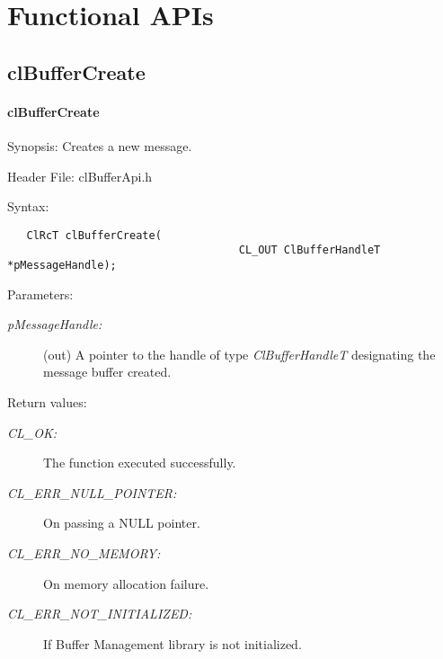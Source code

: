 \newpage
\section{Functional APIs}
\subsection{clBufferCreate}
\hypertarget{pagebuf103}{}\paragraph{cl\-Buffer\-Create}\label{pagebuf103}
\begin{Desc}
\item[Synopsis:]Creates a new message.\end{Desc}
\begin{Desc}
\item[Header File:]clBufferApi.h\end{Desc}
\begin{Desc}
\item[Syntax:]

\footnotesize\begin{verbatim}   ClRcT clBufferCreate(
                            		CL_OUT ClBufferHandleT *pMessageHandle);
\end{verbatim}
\normalsize
\end{Desc}
\begin{Desc}
\item[Parameters:]
\begin{description}
\item[{\em p\-Message\-Handle:}](out) A pointer to the handle of type {\em Cl\-Buffer\-Handle\-T\/} designating the message buffer created.\end{description}
\end{Desc}
\begin{Desc}
\item[Return values:]
\begin{description}
\item[{\em CL\_\-OK:}]The function executed successfully. 
\item[{\em CL\_\-ERR\_\-NULL\_\-POINTER:}]On passing a NULL pointer. 
\item[{\em CL\_\-ERR\_\-NO\_\-MEMORY:}]On memory allocation failure. 
\item[{\em CL\_\-ERR\_\-NOT\_\-INITIALIZED:}]If Buffer Management library is not initialized.\end{description}
\end{Desc}
